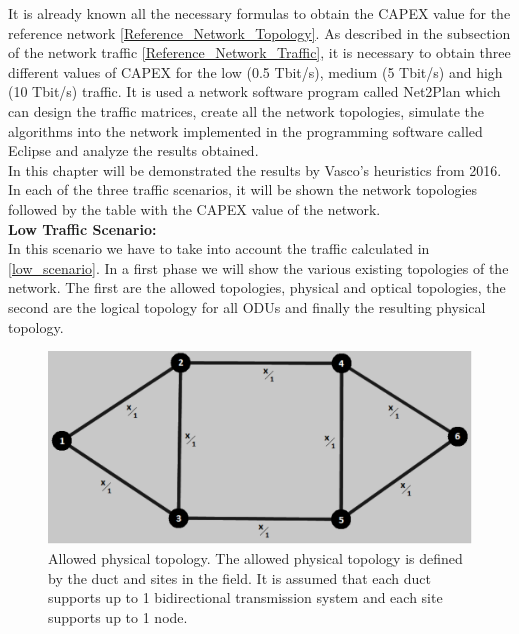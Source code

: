 It is already known all the necessary formulas to obtain the CAPEX value for the reference network \ref{Reference_Network_Topology}. As described in the subsection of the network traffic \ref{Reference_Network_Traffic}, it is necessary to obtain three different values of CAPEX for the low (0.5 Tbit/s), medium (5 Tbit/s) and high (10 Tbit/s) traffic. It is used a network software program called Net2Plan which can design the traffic matrices, create all the network topologies, simulate the algorithms into the network implemented in the programming software called Eclipse and analyze the results obtained.\\
In this chapter will be demonstrated the results by Vasco's heuristics from 2016. In each of the three traffic scenarios, it will be shown the network topologies followed by the table with the CAPEX value of the network.\\

\noindent
\textbf{Low Traffic Scenario:}\\

In this scenario we have to take into account the traffic calculated in \ref{low_scenario}. In a first phase we will show the various existing topologies of the network. The first are the allowed topologies, physical and optical topologies, the second are the logical topology for all ODUs and finally the resulting physical topology.\\

\begin{figure}[H]
\centering
\includegraphics[width=13cm]{sdf/heuristic/opaque_protection/figures/allowed_physical}
\caption{Allowed physical topology. The allowed physical topology is defined by the duct and sites in the field. It is assumed that each duct supports up to 1 bidirectional transmission system and each site supports up to 1 node.}
\label{allowed_physical_protec_ref_low_heuristic}
\end{figure}


